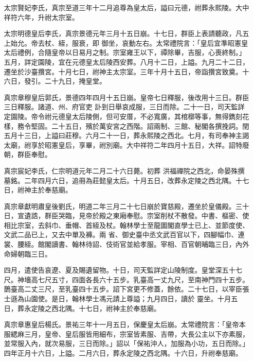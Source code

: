 \begin{pinyinscope}
 太宗賢妃李氏，真宗至道三年十二月追尊為皇太后，謚曰元德，祔葬永熙陵。大中祥符六年，升祔太宗室。



 太宗明德皇后李氏，真宗景德元年三月十五日崩。十七日，群臣上表請聽政，凡五上始允。帝去杖、絰，服衰，即
 御坐，哀動左右。太常禮院言：「皇后宜準昭憲皇太后禮例，合隨皇帝以日易月之制。宗室雍王以下，禫除畢，吉服，心喪終制。」五月，詳定園陵，宜在元德皇太后陵西安葬。八月十二日，上謚。九月二十二日，遷坐於沙臺攢宮。十月七日，祔神主太宗室。三年十月十五日，帝詣攢宮致奠。十六日，發引。二十九日，掩皇堂。



 真宗章穆皇后郭氏，景德四年四月十五日崩。皇帝七日釋服，後改用十三日。群臣三日釋服。諸道、州、府官吏
 訃到日舉哀成服，三日而除。二十一日，司天監詳定園陵。帝令祔元德皇太后陵側，但可安厝，不必寬廣，其棺槨等事，無得鐫刻花樣，務令堅固。二十五日，殯於萬安宮之西階。詔兩制、三館、秘閣各撰挽詞。閏五月十三日，上謚曰莊穆。六月二十一日，葬永熙陵之西北。七月，有司奉神主謁太廟，祔享於昭憲皇后，享畢，祔別廟。大中祥符二年四月十五日，大祥。詔特廢朝，群臣奉慰。



 真宗宸妃李氏，仁宗明道元年二月二十六日薨。初葬
 洪福禪院之西北，命晏殊撰墓銘。二年四月六日，追冊為莊懿皇太后。十月五日，改葬永定陵之西北隅。十七日，祔神主於奉慈廟。



 真宗章獻明肅皇後劉氏，明道二年三月二十七日崩於寶慈殿，遷坐於皇儀殿。三十日，宣遺誥，群臣哭臨，見帝於殿之東廂奉慰。宗室削杖不散發。中書、樞密、使相比宗室，去斜巾、垂帽、首絰及杖。翰林學士至龍圖閣直學士已上、並節度使、文武二品已上，又去中單及褲。兩
 省、御史臺中丞文武百官以下，四腳幅巾、連裳、腰絰。館閣讀書、翰林待詔、伎術官並給孝服。宰相、百官朝晡臨三日，內外命婦朝臨三日。



 四月，遣使告哀遼、夏及賜遺留物。十日，司天監詳定山陵制度。皇堂深五十七尺。神墻高七尺五寸，四面各長六十五步。乳臺高一丈九尺，至南神門四十五步。鵲臺高二丈三尺，至乳臺四十五步。詔下宮更不修蓋，餘依。二十七日，以宰臣張士遜為山園使。是日，翰林學士馮元請上尊謚；九月四日，讀於
 靈坐。十月五日，葬永定陵之西北隅。十七日，祔神主於奉慈廟。



 真宗章惠皇后楊氏。景祐三年十一月五日，保慶皇太后崩。太常禮院言：「皇帝本服緦麻三月，皇帝、皇后服皆用細布，宗室皆素服、吉帶，大長公主以下亦素服，並常服入內，就次易服，三日而除。」詔以「保祐沖人，加服為小功，五日而除。」四年正月十六日，上謚。二月六日，葬永定陵之西北隅。十六日，升祔奉慈廟。




\end{pinyinscope}
